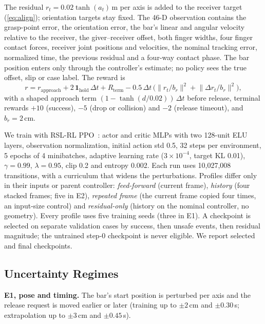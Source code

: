 \documentclass[conference,letterpaper]{IEEEtran}
\begin{document}
The residual $r_t = 0.02\tanh(a_t)$\,m per axis is added to the receiver target (\cref{eq:align}); orientation
targets stay fixed. The 46-D observation contains the grasp-point error, the orientation error, the bar's linear and
angular velocity relative to the receiver, the giver--receiver offset, both finger widths, four finger contact
forces, receiver joint positions and velocities, the nominal tracking error, normalized time, the previous residual
and a four-way contact phase. The bar position enters only through the controller's estimate; no policy sees the
true offset, slip or case label. The reward is
\begin{equation*}
r = r_{\text{approach}} + 2\,\mathbf{1}_{\text{hold}}\,\Delta t + R_{\text{term}}
  - 0.5\,\Delta t\,\big(\lVert r_t/b_r\rVert^2 + \lVert \Delta r_t/b_r\rVert^2\big),
\end{equation*}
with a shaped approach term $(1-\tanh(d/0.02))\,\Delta t$ before release, terminal rewards $+10$ (success), $-5$
(drop or collision) and $-2$ (release timeout), and $b_r = 2$\,cm.

We train with RSL-RL PPO~\cite{schwarke2025rslrl,schulman2017ppo}: actor and critic MLPs with two 128-unit ELU layers,
observation normalization, initial action std 0.5, 32 steps per environment, 5 epochs of 4 minibatches, adaptive
learning rate ($3\times10^{-4}$, target KL 0.01), $\gamma=0.99$, $\lambda=0.95$, clip 0.2 and entropy 0.002. Each run
uses 10,027,008 transitions, with a curriculum that widens the perturbations. Profiles differ only in their inputs or
parent controller: \emph{feed-forward} (current frame), \emph{history} (four stacked frames; five in E2), \emph{repeated frame}
(the current frame copied four times, an input-size control) and \emph{residual-only} (history on the nominal
controller, no geometry). Every profile uses five training seeds (three in E1). A checkpoint is selected on separate
validation cases by success, then unsafe events, then residual magnitude; the untrained step-0 checkpoint is never
eligible. We report selected and final checkpoints.

\subsection{Uncertainty Regimes}
\label{sec:regimes}

\textbf{E1, pose and timing.} The bar's start position is perturbed per axis and the release request is moved
earlier or later (training up to $\pm2$\,cm and $\pm0.30$\,s; extrapolation up to $\pm3$\,cm and $\pm0.45$\,s).
\end{document}

